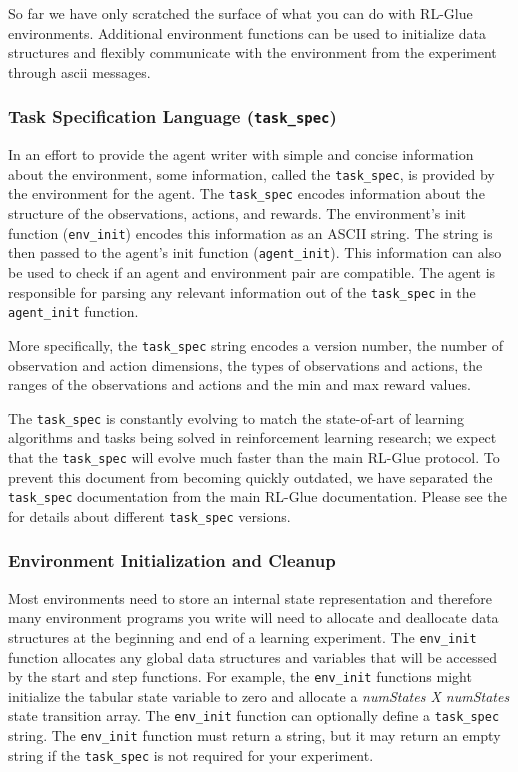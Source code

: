 \documentclass[11pt]{article}
\begin{document}
So far we have only scratched the surface of what you can do with RL-Glue environments. Additional environment functions can be used to initialize data structures and flexibly communicate with the environment from the experiment through ascii messages.

\subsubsection{Task Specification Language (\texttt{task\_spec})}
\label{task}
In an effort to provide the agent writer with simple and concise information about the environment, some information, called the \texttt{task\_spec}, is provided by the environment for the agent.  The \texttt{task\_spec} encodes information about the structure of the observations, actions, and rewards. The environment's init function (\texttt{env\_init}) encodes this information as an ASCII string. The string is then passed to the agent's init function (\texttt{agent\_init}).  This information can also be used to check if an agent and environment pair are compatible. The agent is responsible for parsing any relevant information out of the \texttt{task\_spec} in the \texttt{agent\_init}  function. 

More specifically, the \texttt{task\_spec} string encodes a version number, the number of observation and action dimensions, the types of observations and actions, the ranges of the observations and actions and the min and max reward values. 

The \texttt{task\_spec} is constantly evolving to match the state-of-art of learning algorithms and tasks being solved in reinforcement learning research; we expect that the \texttt{task\_spec} will evolve much faster than the main RL-Glue protocol.  To prevent this document from becoming quickly outdated, we have separated the \texttt{task\_spec} documentation from the main RL-Glue documentation. Please see the  for details about different \texttt{task\_spec} versions.


        
\subsubsection{Environment Initialization and Cleanup}        
Most environments need to store an internal state representation and therefore many environment programs you write will need to allocate and deallocate data structures at the beginning and end of a learning experiment. The \texttt{env\_init} function allocates any global data structures and variables that will be accessed by the start and step functions. For example, the \texttt{env\_init} functions might initialize the tabular state variable to zero and allocate a {\it numStates X numStates} state transition array. The \texttt{env\_init} function can optionally define a \texttt{task\_spec} string. The \texttt{env\_init} function must return a string, but it may return an empty string if the \texttt{task\_spec} is not required for your experiment.
\end{document}
